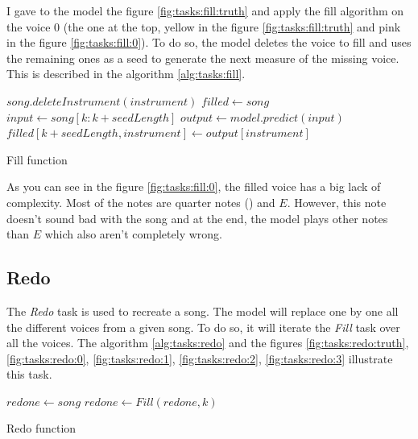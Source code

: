 \documentclass[12pt]{report}
\begin{document}
I gave to the model the figure \ref{fig:tasks:fill:truth} and apply the fill algorithm on the voice $0$ (the one at the top, yellow in the figure \ref{fig:tasks:fill:truth} and pink in the figure \ref{fig:tasks:fill:0}).
To do so, the model deletes the voice to fill and uses the remaining ones as a seed to generate the next measure of the missing voice.
This is described in the algorithm \ref{alg:tasks:fill}.


\begin{algorithm}
    \begin{algorithmic}[1]
        \Statex
            \State $song.deleteInstrument(instrument)$
            \State $filled \gets song$
                \State $input \gets song[k:k + seedLength]$
                \State $output \gets model.predict(input)$
                \State $filled[k + seedLength, instrument] \gets output[instrument]$
            \EndFor
            \State {}
        \EndFunction
        \end{algorithmic}
    \caption{Fill function}
    \label{alg:tasks:fill}
\end{algorithm}

As you can see in the figure \ref{fig:tasks:fill:0}, the filled voice has a big lack of complexity.
Most of the notes are quarter notes (\musQuarter) and $E$.
However, this note doesn't sound bad with the song and at the end, the model plays other notes than $E$ which also aren't completely wrong.

\subsection{Redo}
\label{sec:tasks:redo}

The \textit{Redo} task is used to recreate a song.
The model will replace one by one all the different voices from a given song.
To do so, it will iterate the \textit{Fill} task over all the voices.
The algorithm \ref{alg:tasks:redo} and the figures \ref{fig:tasks:redo:truth}, \ref{fig:tasks:redo:0}, \ref{fig:tasks:redo:1}, \ref{fig:tasks:redo:2}, \ref{fig:tasks:redo:3} illustrate this task.

\begin{algorithm}
    \begin{algorithmic}[1]
        \Statex
            \State $redone \gets song$
                \State $redone \gets Fill(redone, k)$
            \EndFor
            \State {}
        \EndFunction
        \end{algorithmic}
    \caption{Redo function}
    \label{alg:tasks:redo}
\end{algorithm}
\end{document}
